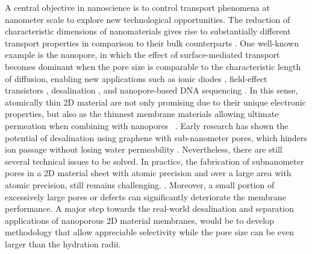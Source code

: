 %
A central objective in nano\-science is to control transport phenomena
at nanometer scale to explore new technological opportunities.  The
reduction of characteristic dimensions of nano\-materials gives rise
to substantially different transport properties in comparison to their
bulk counterparts \cite{Schoch_2008_nanofluid}.
%
One well-known example is the nanopore, in which the effect of
surface-mediated transport becomes dominant when the pore size is
comparable to the characteristic length of diffusion, enabling new
applications such as ionic diodes
\cite{Karnik_2007_nanofluidic,Siwy_2002_fabrication_NPore,Vlassiouk_2007_nanofluidic},
field-effect transistors \cite{Nam_2009_IFET_sub10nm}, desalination
\cite{Heiranian_2015_desali}, and nanopore-based DNA sequencing
\cite{Heerema_2016_gr_np_DNA,Garaj_2013_hugging_gr_pore}.
%
In this sense, atomically thin 2D material are not only promising due
to their unique electronic properties, but also as the thinnest
membrane materials allowing ultimate permeation when combining with
nanopores
~\cite{Suk_2010_water_PG,Jiang_2009_PG_gas,Celebi_2014_science,Koenig_2012,Drahushuk_2012_gas_permeation_gr}.
%
Early research has shown the potential of desalination using graphene
with sub-nanometer pores, which hinders ion passage without losing
water permeability
\cite{Cohen_Tanugi_2012,Suk_2014_ion_sub_5nm,Cohen_Tanugi_2014_permeab,Cohen_Tanugi_2015_PG,O_Hern_2014_ion,O_Hern_2015_ion_gr,Surwade_2015_desali_npg,Walker_2017_cation_select_2D,Ghosh_2018_PG_ion}.
Nevertheless, there are still several technical issues to be solved.
In practice, the fabrication of sub\-nanometer pores in
a 2D material sheet with atomic precision and over a large area with
atomic precision, still remains challenging.
\cite{Suk_2014_ion_sub_5nm,Rollings_2016_gating,O_Hern_2012_defect,Wang_2017_mechanism_thin_membrane}.
%
Moreover, a small portion of excessively large pores or defects can
significantly deteriorate the membrane performance.
%
A major step towards the real-world desalination and separation
applications of nanoporous 2D material membranes, would be to develop
methodology that allow appreciable selectivity while the pore size can
be even larger than the hydration radii.

